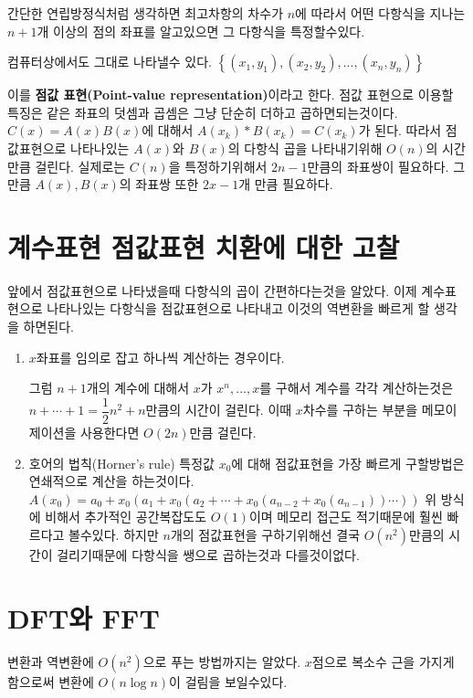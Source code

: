 \documentclass{oblivoir}
\begin{document}
간단한 연립방정식처럼 생각하면 최고차항의 차수가 $n$에 따라서 어떤 다항식을 지나는 $n+1$개 이상의 점의 좌표를 알고있으면 그 다항식을 특정할수있다.

컴퓨터상에서도 그대로 나타낼수 있다.
$\left\{(x_1, y_1),(x_2, y_2), ... ,(x_n, y_n)\right\}$

이를 \textbf{점값 표현(Point-value representation)}이라고 한다.
점값 표현으로 이용할 특징은 같은 좌표의 덧셈과 곱셈은 그냥 단순히 더하고 곱하면되는것이다. 
$C(x) = A(x)B(x)$에 대해서 $A(x_k)*B(x_k) = C(x_k)$가 된다. 따라서 점값표현으로 나타나있는 $A(x)$와 $B(x)$의 다항식 곱을 나타내기위해 $O(n)$의 시간만큼 걸린다. 실제로는 $C(n)$을 특정하기위해서 $2n-1$만큼의 좌표쌍이 필요하다.
그만큼 $A(x), B(x)$의 좌표쌍 또한 $2x-1$개 만큼 필요하다.

\section{계수표현 점값표현 치환에 대한 고찰}
앞에서 점값표현으로 나타냈을때 다항식의 곱이 간편하다는것을 알았다. 이제 계수표현으로 나타나있는 다항식을 점값표현으로 나타내고 이것의 역변환을 빠르게 할 생각을 하면된다.

\begin{enumerate}
    \item $x$좌표를 임의로 잡고 하나씩 계산하는 경우이다.

    그럼 $n+1$개의 계수에 대해서 $x$가 $x^n, ... , x$를 구해서 계수를 각각 계산하는것은 $n + \cdots + 1 = \dfrac{1}{2}n^2 + n$만큼의 시간이 걸린다. 이때 $x$차수를 구하는 부분을 메모이제이션을 사용한다면 $O(2n)$만큼 걸린다.

    \item 호어의 법칙(Horner's rule)
        특정값 $x_0$에 대해 점값표현을 가장 빠르게 구할방법은 연쇄적으로 계산을 하는것이다.
        $A(x_0) = a_0 + x_0(a_1 + x_0(a_2+ \cdots + x_0(a_{n-2} + x_0(a_{n-1})) \cdots ))$
        위 방식에 비해서 추가적인 공간복잡도도 $O(1)$이며 메모리 접근도 적기때문에 훨씬 빠르다고 볼수있다.
        하지만 $n$개의 점값표현을 구하기위해선 결국 $O(n^2)$만큼의 시간이 걸리기때문에 다항식을 쌩으로 곱하는것과 다를것이없다.
\end{enumerate}

\section{DFT와 FFT}
변환과 역변환에 $O(n^2)$으로 푸는 방법까지는 알았다. 
$x$점으로 복소수 근을 가지게 함으로써 변환에 $O(n \log n)$이 걸림을 보일수있다.
\end{document}

